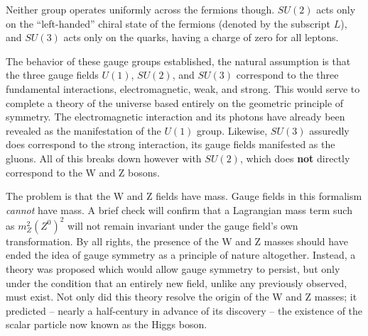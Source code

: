     Neither group operates uniformly across the fermions though.
    $SU(2)$ acts only on the ``left-handed'' chiral state of the fermions (denoted by the subscript $L$),
        and $SU(3)$ acts only on the quarks, having a charge of zero for all leptons.

    The behavior of these gauge groups established, the natural assumption is that the three gauge fields
        $U(1)$, $SU(2)$, and $SU(3)$ correspond to the three fundamental interactions,
        electromagnetic, weak, and strong.
    This would serve to complete a theory of the universe based entirely on the geometric principle of symmetry.
    The electromagnetic interaction and its photons have already been revealed as the manifestation of the $U(1)$ group. 
    Likewise, $SU(3)$ assuredly does correspond to the strong interaction, its gauge fields manifested as the gluons.
    All of this breaks down however with $SU(2)$, which does \textbf{not} directly correspond to the W and Z bosons.

    The problem is that the W and Z fields have mass.
    Gauge fields in this formalism \textit{cannot} have mass.
    A brief check will confirm that a Lagrangian mass term such as $m_Z^2 (Z^0)^2$
        will not remain invariant under the gauge field's own transformation.
    By all rights, the presence of the W and Z masses should have
        ended the idea of gauge symmetry as a principle of nature altogether.
    Instead, a theory was proposed which would allow gauge symmetry to persist,
        but only under the condition that an entirely new field, unlike any previously observed, must exist.
    Not only did this theory resolve the origin of the W and Z masses;
        it predicted -- nearly a half-century in advance of its discovery --
        the existence of the scalar particle now known as the Higgs boson.
    \cite{Osborn_notes}
    \cite{Peskin_book}
    \cite{Halzen_book}

